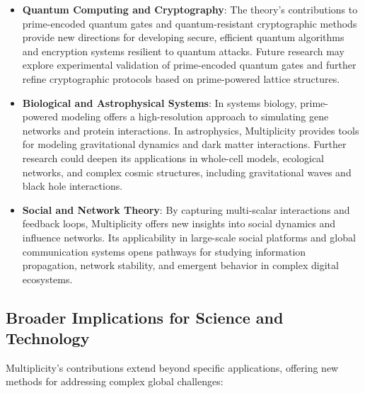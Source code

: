 \documentclass{article}
\begin{document}
\begin{itemize}
    \item \textbf{Quantum Computing and Cryptography}: The theory’s contributions to prime-encoded quantum gates and quantum-resistant cryptographic methods provide new directions for developing secure, efficient quantum algorithms and encryption systems resilient to quantum attacks. Future research may explore experimental validation of prime-encoded quantum gates and further refine cryptographic protocols based on prime-powered lattice structures.
    
    \item \textbf{Biological and Astrophysical Systems}: In systems biology, prime-powered modeling offers a high-resolution approach to simulating gene networks and protein interactions. In astrophysics, Multiplicity provides tools for modeling gravitational dynamics and dark matter interactions. Further research could deepen its applications in whole-cell models, ecological networks, and complex cosmic structures, including gravitational waves and black hole interactions.
    
    \item \textbf{Social and Network Theory}: By capturing multi-scalar interactions and feedback loops, Multiplicity offers new insights into social dynamics and influence networks. Its applicability in large-scale social platforms and global communication systems opens pathways for studying information propagation, network stability, and emergent behavior in complex digital ecosystems.
\end{itemize}

\subsection{Broader Implications for Science and Technology}

Multiplicity’s contributions extend beyond specific applications, offering new methods for addressing complex global challenges:
\end{document}
